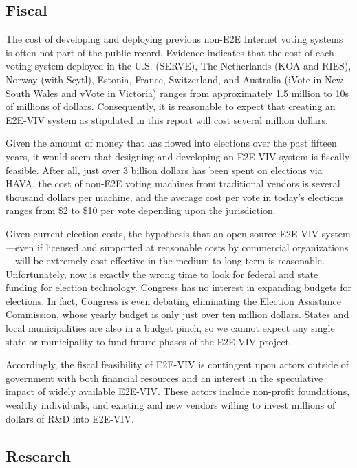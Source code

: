\subsection{Fiscal}
\label{sec:fiscal}

The cost of developing and deploying previous non-E2E Internet voting
systems is often not part of the public record.  Evidence indicates
that the cost of each voting system deployed in the U.S. (SERVE), The
Netherlands (KOA and RIES), Norway (with Scytl), Estonia, France,
Switzerland, and Australia (iVote in New South Wales and vVote in
Victoria) ranges from approximately 1.5 million to 10s of millions of
dollars. Consequently, it is reasonable to expect that creating an
E2E-VIV system as stipulated in this report will cost several million
dollars.

Given the amount of money that has flowed into elections over the past
fifteen years, it would seem that designing and developing an E2E-VIV
system is fiscally feasible. After all, just over 3 billion dollars
has been spent on elections via HAVA, the cost of non-E2E voting
machines from traditional vendors is several thousand dollars per
machine, and the average cost per vote in today's elections ranges
from \$2 to \$10 per vote depending upon the jurisdiction.

Given current election costs, the hypothesis that an open source
E2E-VIV system---even if licensed and supported at reasonable costs by
commercial organizations---will be extremely cost-effective in the
medium-to-long term is reasonable. Unfortunately, now is exactly the
wrong time to look for federal and state funding for election
technology.  Congress has no interest in expanding budgets for
elections. In fact, Congress is even debating eliminating the Election
Assistance Commission, whose yearly budget is only just over ten
million dollars. States and local municipalities are also in a budget
pinch, so we cannot expect any single state or municipality to fund
future phases of the E2E-VIV project.

Accordingly, the fiscal feasibility of E2E-VIV is contingent upon
actors outside of government with both financial resources and an
interest in the speculative impact of widely available E2E-VIV.  These
actors include non-profit foundations, wealthy individuals, and
existing and new vendors willing to invest millions of dollars of R\&D
into E2E-VIV.

\subsection{Research}

